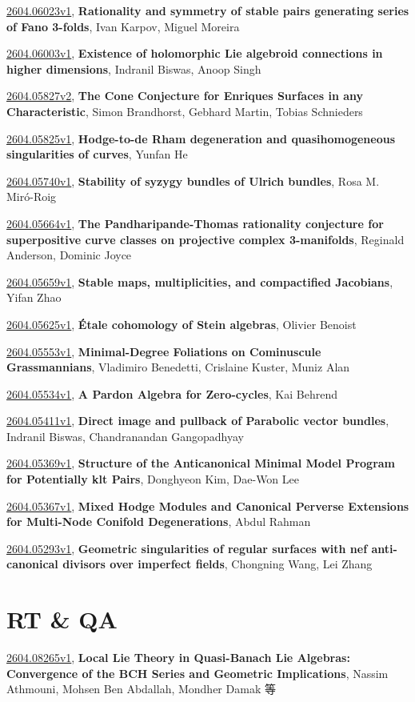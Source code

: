 \documentclass[9pt, a4paper]{article}
\theoremstyle{plain}
\theoremstyle{definition}
\theoremstyle{remark}
\newcommand{\arxiv}[3]{\href{https://arxiv.org/abs/#1}{#1}, \textbf{\textcolor{arxivblue}{#2}}, #3}
\begin{document}
\arxiv{2604.06023v1}{Rationality and symmetry of stable pairs generating series of Fano 3-folds}{Ivan Karpov, Miguel Moreira}

\arxiv{2604.06003v1}{Existence of holomorphic Lie algebroid connections in higher dimensions}{Indranil Biswas, Anoop Singh}

\arxiv{2604.05827v2}{The Cone Conjecture for Enriques Surfaces in any Characteristic}{Simon Brandhorst, Gebhard Martin, Tobias Schnieders}

\arxiv{2604.05825v1}{Hodge-to-de Rham degeneration and quasihomogeneous singularities of curves}{Yunfan He}

\arxiv{2604.05740v1}{Stability of syzygy bundles of Ulrich bundles}{Rosa M. Miró-Roig}

\arxiv{2604.05664v1}{The Pandharipande-Thomas rationality conjecture for superpositive curve classes on projective complex 3-manifolds}{Reginald Anderson, Dominic Joyce}

\arxiv{2604.05659v1}{Stable maps, multiplicities, and compactified Jacobians}{Yifan Zhao}

\arxiv{2604.05625v1}{Étale cohomology of Stein algebras}{Olivier Benoist}

\arxiv{2604.05553v1}{Minimal-Degree Foliations on Cominuscule Grassmannians}{Vladimiro Benedetti, Crislaine Kuster, Muniz Alan}

\arxiv{2604.05534v1}{A Pardon Algebra for Zero-cycles}{Kai Behrend}

\arxiv{2604.05411v1}{Direct image and pullback of Parabolic vector bundles}{Indranil Biswas, Chandranandan Gangopadhyay}

\arxiv{2604.05369v1}{Structure of the Anticanonical Minimal Model Program for Potentially klt Pairs}{Donghyeon Kim, Dae-Won Lee}

\arxiv{2604.05367v1}{Mixed Hodge Modules and Canonical Perverse Extensions for Multi-Node Conifold Degenerations}{Abdul Rahman}

\arxiv{2604.05293v1}{Geometric singularities of regular surfaces with nef anti-canonical divisors over imperfect fields}{Chongning Wang, Lei Zhang}


\section{RT \& QA}
\arxiv{2604.08265v1}{Local Lie Theory in Quasi-Banach Lie Algebras: Convergence of the BCH Series and Geometric Implications}{Nassim Athmouni, Mohsen Ben Abdallah, Mondher Damak 等}
\end{document}
